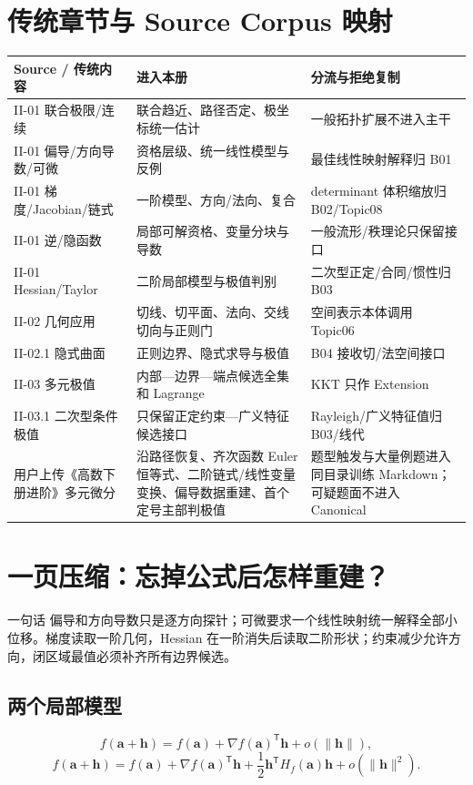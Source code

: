\documentclass[11pt,a4paper,fontset=fandol]{ctexart}
\begin{document}
\section{传统章节与 Source Corpus 映射}
\begin{longtable}{L{2.65cm}L{5.25cm}L{\dimexpr\linewidth-7.90cm\relax}}
\toprule
\textbf{Source / 传统内容} & \textbf{进入本册} & \textbf{分流与拒绝复制}\\
\midrule
II-01 联合极限/连续 & 联合趋近、路径否定、极坐标统一估计 & 一般拓扑扩展不进入主干\\
II-01 偏导/方向导数/可微 & 资格层级、统一线性模型与反例 & 最佳线性映射解释归 B01\\
II-01 梯度/Jacobian/链式 & 一阶模型、方向/法向、复合 & determinant 体积缩放归 B02/Topic08\\
II-01 逆/隐函数 & 局部可解资格、变量分块与导数 & 一般流形/秩理论只保留接口\\
II-01 Hessian/Taylor & 二阶局部模型与极值判别 & 二次型正定/合同/惯性归 B03\\
II-02 几何应用 & 切线、切平面、法向、交线切向与正则门 & 空间表示本体调用 Topic06\\
II-02.1 隐式曲面 & 正则边界、隐式求导与极值 & B04 接收切/法空间接口\\
II-03 多元极值 & 内部—边界—端点候选全集和 Lagrange & KKT 只作 Extension\\
II-03.1 二次型条件极值 & 只保留正定约束—广义特征候选接口 & Rayleigh/广义特征值归 B03/线代\\
用户上传《高数下册进阶》多元微分 & 沿路径恢复、齐次函数 Euler 恒等式、二阶链式/线性变量变换、偏导数据重建、首个定号主部判极值 & 题型触发与大量例题进入同目录训练 Markdown；可疑题面不进入 Canonical\\
\bottomrule
\end{longtable}

\section{一页压缩：忘掉公式后怎样重建？}
\begin{corebox}{一句话}
偏导和方向导数只是逐方向探针；可微要求一个线性映射统一解释全部小位移。梯度读取一阶几何，Hessian 在一阶消失后读取二阶形状；约束减少允许方向，闭区域最值必须补齐所有边界候选。
\end{corebox}

\subsection{两个局部模型}
\[
f(\mathbf a+\mathbf h)=f(\mathbf a)+{\nabla f(\mathbf a)}^{\mathsf T}\mathbf h+o(\lVert\mathbf h\rVert),
\]
\[
f(\mathbf a+\mathbf h)=f(\mathbf a)+{\nabla f(\mathbf a)}^{\mathsf T}\mathbf h
+\frac12\mathbf h^{\mathsf T}H_f(\mathbf a)\mathbf h+o(\lVert\mathbf h\rVert^2).
\]
\end{document}
